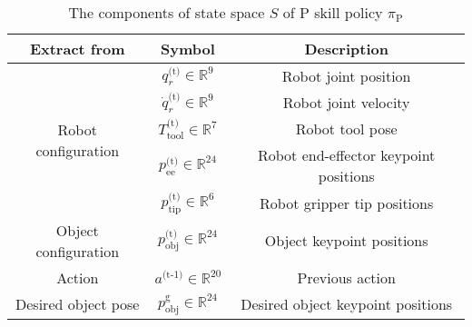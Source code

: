 \begin{table}[H]
\centering
\begin{tabular}{|c|c|c|}
\hline
\textbf{Extract from} & \textbf{Symbol} & \textbf{Description}  \\
\hline
\multirow{5}{*}{Robot configuration}  
\text{ } & $q^\text{(t)}_r\in\mathbb{R}^9$ & Robot joint position   \\
\cline{2-3}
 & $\dot{q}^\text{(t)}_r\in\mathbb{R}^9$ & Robot joint velocity  \\
\cline{2-3}
 & $T^\text{(t)}_\text{tool}\in\mathbb{R}^7$ & Robot tool pose  \\
\cline{2-3}
 & $p^\text{(t)}_\text{ee}\in\mathbb{R}^{24}$ & Robot end-effector keypoint positions  \\
\cline{2-3}
 & $p^\text{(t)}_\text{tip}\in\mathbb{R}^6$ & Robot gripper tip positions\\
 \cline{1-3}
Object configuration & $p^\text{(t)}_\text{obj}\in\mathbb{R}^{24}$ & Object keypoint positions  \\
\hline
Action & $a^\text{(t-1)}\in\mathbb{R}^{20}$ & Previous action \\
\hline
Desired object pose & $p^\text{g}_\text{obj}\in\mathbb{R}^{24}$ & Desired object keypoint positions  \\
\hline
\end{tabular}
\caption{The components of state space $S$ of P skill policy $\pi_\text{P}$}\label{table:P_state}
\end{table}
